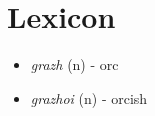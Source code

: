 \documentclass[main.tex]{subfiles}
\newcommand{\lexitem}[3]{\item \textit{#1} (#2) - #3}
\begin{document}
\section{Lexicon}
\begin{itemize}
    \lexitem{grazh}{n}{orc}
    \lexitem{grazhoi}{n}{orcish}
\end{itemize}
\end{document}
